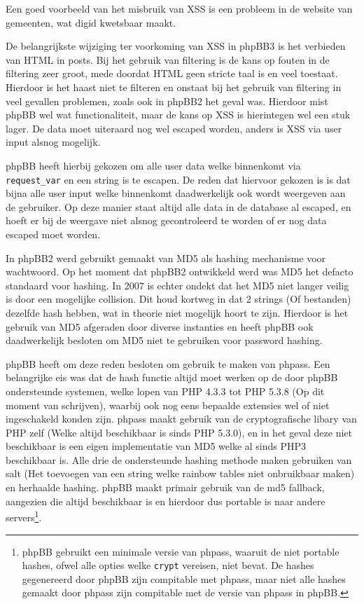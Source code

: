 Een goed voorbeeld van het misbruik van XSS is een probleem in de website van gemeenten, wat digid kwetsbaar maakt\cite{bib.digid}.

De belangrijkste wijziging ter voorkoming van XSS in phpBB3 is het verbieden van HTML in posts. Bij het gebruik van filtering is de kans op fouten in de filtering zeer groot, mede doordat HTML geen stricte taal is en veel toestaat. Hierdoor is het haast niet te filteren en onstaat bij het gebruik van filtering in veel gevallen problemen, zoals ook in phpBB2 het geval was. Hierdoor mist phpBB wel wat functionaliteit, maar de kans op XSS is hierintegen wel een stuk lager. De data moet uiteraard nog wel escaped worden, anders is XSS via user input alsnog mogelijk.

phpBB heeft hierbij gekozen om alle user data welke binnenkomt via \texttt{request\_var} en een string is te escapen. De reden dat hiervoor gekozen is is dat bijna alle user input welke binnenkomt daadwerkelijk ook wordt weergeven aan de gebruiker. Op deze manier staat altijd alle data in de database al escaped, en hoeft er bij de weergave niet alsnog gecontroleerd te worden of er nog data escaped moet worden.

In phpBB2 werd gebruikt gemaakt van MD5 als hashing mechanisme voor wachtwoord. Op het moment dat phpBB2 ontwikkeld werd was MD5 het defacto standaard voor hashing. In 2007 is echter ondekt dat het MD5 niet langer veilig is door een mogelijke collision\cite{bib.md5.col}. Dit houd kortweg in dat 2 strings (Of bestanden) dezelfde hash hebben, wat in theorie niet mogelijk hoort te zijn. Hierdoor is het gebruik van MD5 afgeraden door diverse instanties en heeft phpBB ook daadwerkelijk besloten om MD5 niet te gebruiken voor password hashing.

phpBB heeft om deze reden besloten om gebruik te maken van phpass\cite{bib.phpass}. Een belangrijke eis was dat de hash functie altijd moet werken op de door phpBB ondersteunde systemen, welke lopen van PHP 4.3.3 tot PHP 5.3.8 (Op dit moment van schrijven), waarbij ook nog eens bepaalde extensies wel of niet ingeschakeld konden zijn. phpass\cite{bib.phpass.art}  maakt gebruik van de cryptografische libary van PHP zelf (Welke altijd beschikbaar is sinds PHP 5.3.0), en in het geval deze niet beschikbaar is een eigen implementatie van MD5 welke al sinds PHP3 beschikbaar is. Alle drie de ondersteunde hashing methode maken gebruiken van salt (Het toevoegen van een string welke rainbow tables niet onbruikbaar maken) en herhaalde hashing. phpBB maakt primair gebruik van de md5 fallback, aangezien die altijd beschikbaar is en hierdoor dus portable is naar andere servers\footnote{phpBB gebruikt een minimale versie van phpass, waaruit de niet portable hashes, ofwel alle opties welke \texttt{crypt} vereisen, niet bevat. De hashes gegenereerd door phpBB zijn compitable met phpass, maar niet alle hashes gemaakt door phpass zijn compitable met de versie van phpass in phpBB.}. 

